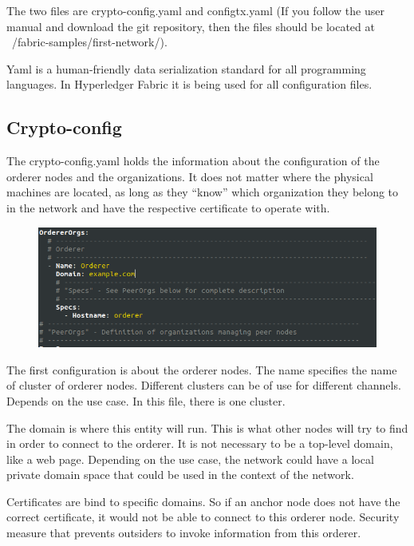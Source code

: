 \documentclass[a4paper,11pt]{report}
\begin{document}
	The two files are crypto-config.yaml and configtx.yaml (If you follow the user manual and download the git repository, then the files should be located at ~/fabric-samples/first-network/). 
	
	Yaml is a human-friendly data serialization standard for all programming languages. In Hyperledger Fabric it is being used for all configuration files. 

\subsection{Crypto-config}

The crypto-config.yaml holds the information about the configuration of the orderer nodes and the organizations. It does not matter where the physical machines are located, as long as they “know” which organization they belong to in the network and have the respective certificate to operate with.

\begin{figure}[h]
\centering
  \includegraphics[width = 16cm]{cryptoconfig1.png}
  \caption{ }
  \label{cryptoconfig1}
\end{figure}

The first configuration is about the orderer nodes. The name specifies the name of cluster of orderer nodes. Different clusters can be of use for different channels. Depends on the use case. In this file, there is one cluster.

The domain is where this entity will run. This is what other nodes will try to find in order to connect to the orderer. It is not necessary to be a top-level domain, like a web page. Depending on the use case, the network could have a local private domain space that could be used in the context of the network.

Certificates are bind to specific domains. So if an anchor node does not have the correct certificate, it would not be able to connect to this orderer node. Security measure that prevents outsiders to invoke information from this orderer.
\end{document}
